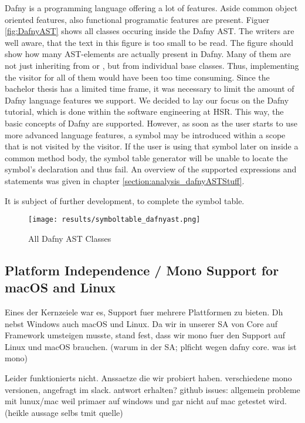Dafny is a programming language offering a lot of features.
Aside common object oriented features, also functional programatic features are present.
Figuer \ref{fig:DafnyAST} shows all classes occuring inside the Dafny AST.
The writers are well aware, that the text in this figure is too small to be read.
The figure should  show how many AST-elements are actually present in Dafny.
Many of them are not just inheriting from  or , but from individual base classes.
Thus, implementing the visitor for all of them would have been too time consuming.
Since the bachelor thesis has a limited time frame, it was necessary to limit the amount of Dafny language features we support.
We decided to lay our focus on the Dafny tutorial, which is done within the software engineering at HSR.
This way, the basic concepts of Dafny are supported.
However, as soon as the user starts to use more advanced language features, a symbol may be introduced within a scope that is not visited by the visitor.
If the user is using that symbol later on inside a common method body, the symbol table generator will be unable to locate the symbol's declaration and thus fail.
An overview of the supported expressions and statements was given in chapter \ref{section:analysis_dafnyASTStuff}.


It is subject of further development, to complete the symbol table.
\begin{figure}[h]
    \centering
    \texttt{[image: results/symboltable\_dafnyast.png]}
    \caption{All Dafny AST Classes}
    \label{fig:dafnyASTOverview}
\end{figure}



\subsection{Platform Independence / Mono Support for macOS and Linux}
Eines der Kernzeiele war es, Support fuer mehrere Plattformen zu bieten. Dh nebst Windows auch macOS und Linux.
Da wir in unserer SA von Core auf Framework umsteigen musste, stand fest, dass wir mono fuer den Support auf Linux und macOS brauchen.
(warum in der SA; plficht wegen dafny core. was ist mono)

Leider funktionierts nicht.
Anssaetze die wir probiert haben. verschiedene mono versionen, angefragt im slack. antwort erhalten?
github issues: allgemein probleme mit lunux/mac weil primaer auf windows und gar nicht auf mac getestet wird. (heikle aussage selbs tmit quelle)

